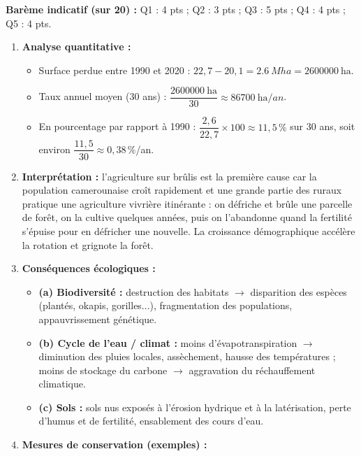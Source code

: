 \documentclass[11pt]{article}
\begin{document}
\begin{corrige}
\textbf{Barème indicatif (sur 20) :} Q1 : 4 pts ; Q2 : 3 pts ; Q3 : 5 pts ; Q4 : 4 pts ; Q5 : 4 pts.

\begin{enumerate}
    \item \textbf{Analyse quantitative :}
    \begin{itemize}
        \item Surface perdue entre 1990 et 2020 : $22,7 - 20,1 = \SI{2,6}{Mha} = \SI{2600000}{\hectare}$.
        \item Taux annuel moyen (30 ans) : $\dfrac{\SI{2600000}{\hectare}}{30} \approx \SI{86700}{\hectare/an}$.
        \item En pourcentage par rapport à 1990 : $\dfrac{2,6}{22,7} \times 100 \approx 11,5\,\%$ sur 30 ans, soit environ $\dfrac{11,5}{30} \approx 0,38\,\%$/an.
    \end{itemize}
    \item \textbf{Interprétation :} l'agriculture sur brûlis est la première cause car la population camerounaise croît rapidement et une grande partie des ruraux pratique une agriculture vivrière itinérante : on défriche et brûle une parcelle de forêt, on la cultive quelques années, puis on l'abandonne quand la fertilité s'épuise pour en défricher une nouvelle. La croissance démographique accélère la rotation et grignote la forêt.
    \item \textbf{Conséquences écologiques :}
    \begin{itemize}
        \item \textbf{(a) Biodiversité :} destruction des habitats $\rightarrow$ disparition des espèces (plantés, okapis, gorilles...), fragmentation des populations, appauvrissement génétique.
        \item \textbf{(b) Cycle de l'eau / climat :} moins d'évapotranspiration $\rightarrow$ diminution des pluies locales, assèchement, hausse des températures ; moins de stockage du carbone $\rightarrow$ aggravation du réchauffement climatique.
        \item \textbf{(c) Sols :} sols nus exposés à l'érosion hydrique et à la latérisation, perte d'humus et de fertilité, ensablement des cours d'eau.
    \end{itemize}
    \item \textbf{Mesures de conservation (exemples) :}
    \begin{itemize}

\end{itemize}
\end{enumerate}
\end{corrige}
\end{document}
